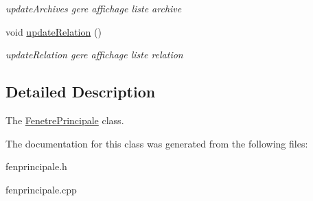 \begin{DoxyCompactItemize}
\begin{DoxyCompactList}\small\item\em update\+Archives gere affichage liste archive \end{DoxyCompactList}\item 
\mbox{\label{class_fenetre_principale_aba9b6d1406b9b92cf649f170671740aa}} 
void \hyperlink{class_fenetre_principale_aba9b6d1406b9b92cf649f170671740aa}{update\+Relation} ()
\begin{DoxyCompactList}\small\item\em update\+Relation gere affichage liste relation \end{DoxyCompactList}\end{DoxyCompactItemize}


\subsection{Detailed Description}
The \hyperlink{class_fenetre_principale}{Fenetre\+Principale} class. 

The documentation for this class was generated from the following files\+:\begin{DoxyCompactItemize}
\item 
fenprincipale.\+h\item 
fenprincipale.\+cpp\end{DoxyCompactItemize}
